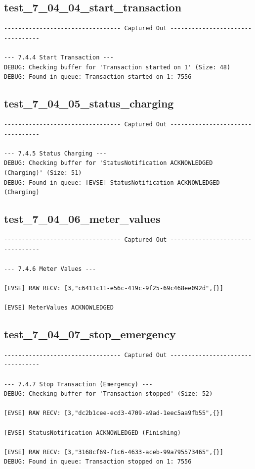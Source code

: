 \documentclass{article}
\begin{document}
\subsection*{test\_7\_04\_04\_start\_transaction}
\begin{lstlisting}
--------------------------------- Captured Out ---------------------------------

--- 7.4.4 Start Transaction ---
DEBUG: Checking buffer for 'Transaction started on 1' (Size: 48)
DEBUG: Found in queue: Transaction started on 1: 7556
\end{lstlisting}
\subsection*{test\_7\_04\_05\_status\_charging}
\begin{lstlisting}
--------------------------------- Captured Out ---------------------------------

--- 7.4.5 Status Charging ---
DEBUG: Checking buffer for 'StatusNotification ACKNOWLEDGED (Charging)' (Size: 51)
DEBUG: Found in queue: [EVSE] StatusNotification ACKNOWLEDGED (Charging)
\end{lstlisting}
\subsection*{test\_7\_04\_06\_meter\_values}
\begin{lstlisting}
--------------------------------- Captured Out ---------------------------------

--- 7.4.6 Meter Values ---

[EVSE] RAW RECV: [3,"c6411c11-e56c-419c-9f25-69c468ee092d",{}]

[EVSE] MeterValues ACKNOWLEDGED
\end{lstlisting}
\subsection*{test\_7\_04\_07\_stop\_emergency}
\begin{lstlisting}
--------------------------------- Captured Out ---------------------------------

--- 7.4.7 Stop Transaction (Emergency) ---
DEBUG: Checking buffer for 'Transaction stopped' (Size: 52)

[EVSE] RAW RECV: [3,"dc2b1cee-ecd3-4709-a9ad-1eec5aa9fb55",{}]

[EVSE] StatusNotification ACKNOWLEDGED (Finishing)

[EVSE] RAW RECV: [3,"3168cf69-f1c6-4633-aceb-99a795573465",{}]
DEBUG: Found in queue: Transaction stopped on 1: 7556
\end{lstlisting}
\end{document}
